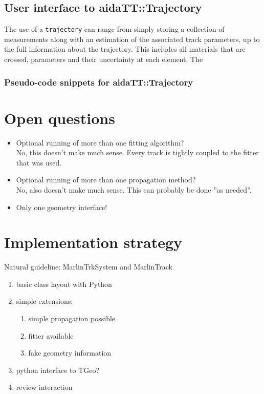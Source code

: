 \documentclass[12pt]{article}
\begin{document}
\subsection{User interface to aidaTT::Trajectory}
The use of a {\tt trajectory} can range from simply storing a collection of measurements along with an estimation of the associated track parameters, up to the full information about the trajectory.
This includes all materials that are crossed, parameters and their uncertainty at each element.
The 

\subsubsection{Pseudo-code snippets for aidaTT::Trajectory}






\section{Open questions}
\begin{itemize}
    \item Optional running of more than one fitting algorithm?\\
		No, this doesn't make much sense. Every track is tightly coupled to the fitter that was used.
    \item Optional running of more than one propagation method?\\
		No, also doesn't make much sense. This can probably be done ''as needed''.
    \item Only one geometry interface!
\end{itemize}

\section{Implementation strategy}
Natural guideline: MarlinTrkSystem and MarlinTrack
\begin{enumerate}
    \item basic class layout with Python
    \item simple extensions: 
        \begin{enumerate}
            \item simple propagation possible
            \item fitter available
            \item fake geometry information
        \end{enumerate}
    \item python interface to TGeo?
    \item review interaction
\end{enumerate}
\end{document}
